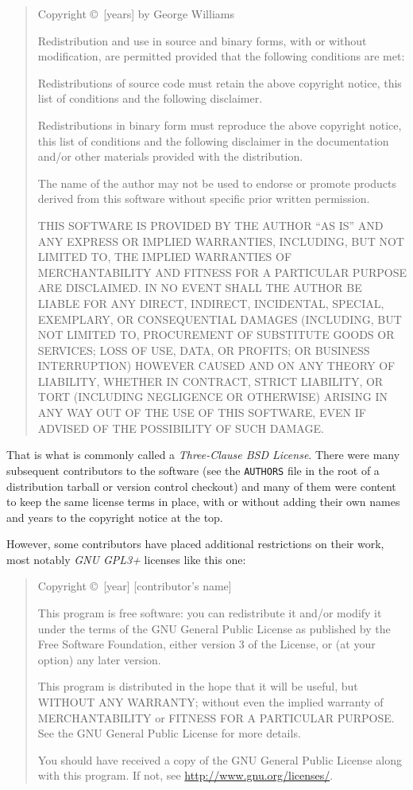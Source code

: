 \documentclass[11pt]{report}
\begin{document}
\begin{quotation}
Copyright \copyright\ [years] by George Williams

Redistribution and use in source and binary forms, with or without
modification, are permitted provided that the following conditions are met:

Redistributions of source code must retain the above copyright notice, this
list of conditions and the following disclaimer.

Redistributions in binary form must reproduce the above copyright notice,
this list of conditions and the following disclaimer in the documentation
and/or other materials provided with the distribution.

The name of the author may not be used to endorse or promote products
derived from this software without specific prior written permission.

THIS SOFTWARE IS PROVIDED BY THE AUTHOR ``AS IS'' AND ANY EXPRESS OR IMPLIED
WARRANTIES, INCLUDING, BUT NOT LIMITED TO, THE IMPLIED WARRANTIES OF
MERCHANTABILITY AND FITNESS FOR A PARTICULAR PURPOSE ARE DISCLAIMED.  IN NO
EVENT SHALL THE AUTHOR BE LIABLE FOR ANY DIRECT, INDIRECT, INCIDENTAL,
SPECIAL, EXEMPLARY, OR CONSEQUENTIAL DAMAGES (INCLUDING, BUT NOT LIMITED TO,
PROCUREMENT OF SUBSTITUTE GOODS OR SERVICES; LOSS OF USE, DATA, OR PROFITS;
OR BUSINESS INTERRUPTION) HOWEVER CAUSED AND ON ANY THEORY OF LIABILITY,
WHETHER IN CONTRACT, STRICT LIABILITY, OR TORT (INCLUDING NEGLIGENCE OR
OTHERWISE) ARISING IN ANY WAY OUT OF THE USE OF THIS SOFTWARE, EVEN IF
ADVISED OF THE POSSIBILITY OF SUCH DAMAGE.
\end{quotation}

That is what is commonly called a \emph{Three-Clause BSD License}.  There
were many subsequent contributors to the software (see the \texttt{AUTHORS}
file in the root of a distribution tarball or version control checkout) and
many of them were content to keep the same license terms in place, with or
without adding their own names and years to the copyright notice at the
top.

However, some contributors have placed additional restrictions on their
work, most notably \emph{GNU GPL3+} licenses like this one:

\begin{quotation}
Copyright \copyright\ [year] [contributor's name]

This program is free software: you can redistribute it and/or modify
it under the terms of the GNU General Public License as published by
the Free Software Foundation, either version 3 of the License, or
(at your option) any later version.

This program is distributed in the hope that it will be useful,
but WITHOUT ANY WARRANTY; without even the implied warranty of
MERCHANTABILITY or FITNESS FOR A PARTICULAR PURPOSE.  See the
GNU General Public License for more details.

You should have received a copy of the GNU General Public License
along with this program.  If not, see
\url{http://www.gnu.org/licenses/}.
\end{quotation}
\end{document}

